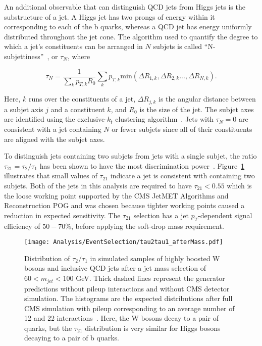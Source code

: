 An additional observable that can distinguish QCD jets from Higgs jets is the substructure of a jet. A Higgs jet has two prongs of energy within it corresponding to each of the b quarks, whereas a QCD jet has energy uniformly distributed throughout the jet cone. The algorithm used to quantify the degree to which a jet's constituents can be arranged in $N$ subjets is called ``N-subjettiness''~\cite{BoostTop}, or $\tau_{N}$, where

\begin{equation}
\tau_{N} = \frac{1}{\sum_{k}p_{T,k}R_{0}}\sum_{k}p_{T,k}\mathrm{min}(\Delta R_{1,k},\Delta R_{2,k}...,\Delta R_{N,k}).
\end{equation}

\noindent
Here, $k$ runs over the constituents of a jet, $\Delta R_{j,k}$ is the angular distance between a subjet axis $j$ and a constituent $k$, and $R_{0}$ is the size of the jet. The subjet axes are identified using the exclusive-$k_{t}$ clustering algorithm~\cite{kTCluster, kTCluster2}. Jets with $\tau_{N}=0$ are consistent with a jet containing $N$ or fewer subjets since all of their constituents are aligned with the subjet axes. 

To distinguish jets containing two subjets from jets with a single subjet, the ratio $\tau_{21}=\tau_{2}/\tau_{1}$ has been shown to have the most discrimination power~\cite{BoostNsub}. Figure~\ref{fig:QCDtau21} illustrates that small values of $\tau_{21}$ indicate a jet is consistent with containing two subjets. Both of the jets in this analysis are required to have $\tau_{21} < 0.55$ which is the loose working point supported by the CMS JetMET Algorithms and Reconstruction POG and was chosen because tighter working points caused a reduction in expected sensitivity. The $\tau_{21}$ selection has a jet $p_{T}$-dependent signal efficiency of $50-70\%$, before applying the soft-drop mass requirement.

\begin{figure}[h!]
\begin{center}
\texttt{[image: Analysis/EventSelection/tau2tau1\_afterMass.pdf]}
\end{center}
\caption{Distribution of $\tau_{2}/\tau_{1}$ in simulated samples of highly boosted W bosons and inclusive QCD jets after a jet mass selection of $60<m_{jet}<100$ GeV. Thick dashed lines represent the generator predictions without pileup interactions and without CMS detector simulation. The histograms are the expected distributions after full CMS simulation with pileup corresponding to an average number of 12 and 22 interactions~\cite{QCDJetMass}. Here, the W bosons decay to a pair of quarks, but the $\tau_{21}$ distribution is very similar for Higgs bosons decaying to a pair of b quarks.}
\label{fig:QCDtau21}
\end{figure}

